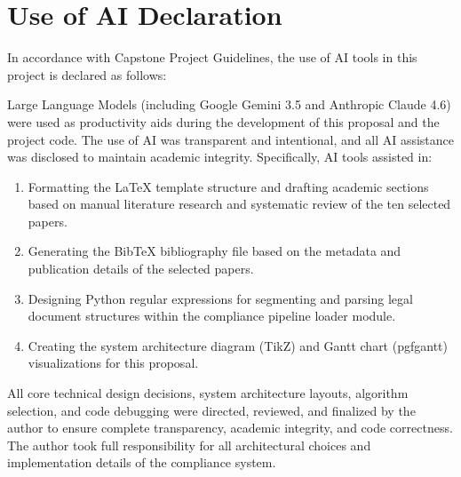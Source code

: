 \documentclass[11pt,a4paper]{article}
\begin{document}
\section{Use of AI Declaration}
In accordance with Capstone Project Guidelines, the use of AI tools in this project is declared as follows:

Large Language Models (including Google Gemini 3.5 and Anthropic Claude 4.6) were used as productivity aids during the development of this proposal and the project code. The use of AI was transparent and intentional, and all AI assistance was disclosed to maintain academic integrity. Specifically, AI tools assisted in:

\begin{enumerate}
    \item Formatting the LaTeX template structure and drafting academic sections based on manual literature research and systematic review of the ten selected papers.
    \item Generating the BibTeX bibliography file based on the metadata and publication details of the selected papers.
    \item Designing Python regular expressions for segmenting and parsing legal document structures within the compliance pipeline loader module.
    \item Creating the system architecture diagram (TikZ) and Gantt chart (pgfgantt) visualizations for this proposal.
\end{enumerate}

All core technical design decisions, system architecture layouts, algorithm selection, and code debugging were directed, reviewed, and finalized by the author to ensure complete transparency, academic integrity, and code correctness. The author took full responsibility for all architectural choices and implementation details of the compliance system.



\end{document}
